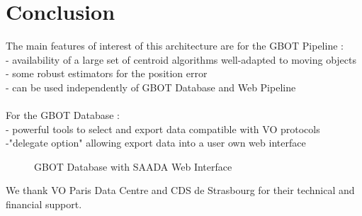 \section{Conclusion}
The main features of interest of this architecture  are for the GBOT Pipeline :\\
\hspace*{0.25cm}- availability of a large set of centroid algorithms well-adapted to moving objects\\
\hspace*{0.25cm}- some robust estimators for the position error \\
\hspace*{0.25cm}- can be used independently of GBOT Database and Web Pipeline\\\\
For the GBOT Database : \\
\hspace*{0.25cm}- powerful tools to select and export data compatible with VO protocols \\
\hspace*{0.25cm}-"delegate option" allowing export data into a user own web interface

\begin{figure}[ht]
\caption{GBOT Database with SAADA Web Interface} \label{P03-fig-1}
\end{figure}



\acknowledgements 
We thank VO Paris Data Centre and CDS de Strasbourg for their technical and financial support.



